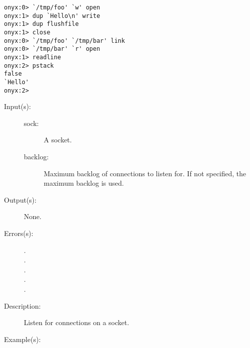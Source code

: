 \begin{description}
\begin{description}
\begin{verbatim}
onyx:0> `/tmp/foo' `w' open
onyx:1> dup `Hello\n' write
onyx:1> dup flushfile
onyx:1> close
onyx:0> `/tmp/foo' `/tmp/bar' link
onyx:0> `/tmp/bar' `r' open
onyx:1> readline
onyx:2> pstack
false
`Hello'
onyx:2>
		\end{verbatim}
	\end{description}
\label{systemdict:listen}
\item[{\onyxop{sock backlog}{listen}{--}}: ]
	\begin{description}\item[]
	\item[Input(s): ]
		\begin{description}\item[]
		\item[sock: ]
			A socket.
		\item[backlog: ]
			Maximum backlog of connections to listen for.  If not
			specified, the maximum backlog is used.
		\end{description}
	\item[Output(s): ] None.
	\item[Errors(s): ]
		\begin{description}\item[]
		\item[.]
		\item[.]
		\item[.]
		\item[.]
		\item[.]
		\end{description}
	\item[Description: ]
		Listen for connections on a socket.
	\item[Example(s): ]\begin{verbatim}


\end{verbatim}
\end{description}
\end{description}
